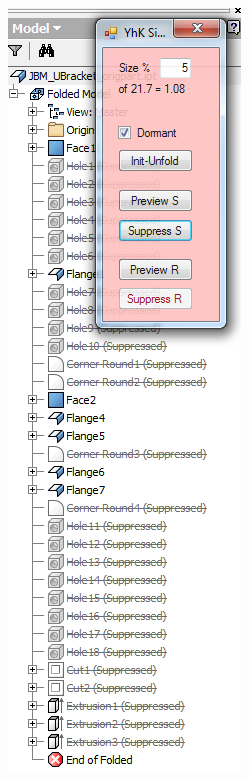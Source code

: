 \begin{minipage}{\linewidth}
\begin{minipage}[c]{0.62\linewidth}
\end{minipage}
\quad
\begin{minipage}[c]{0.3\linewidth}
\includegraphics[width=\linewidth,valign=t]{images/JBM_UBracket_Defeatured_tree}
 \label{fig:results:JBM_UBracket_Defeatured_tree}
\end{minipage}
\end{minipage}

